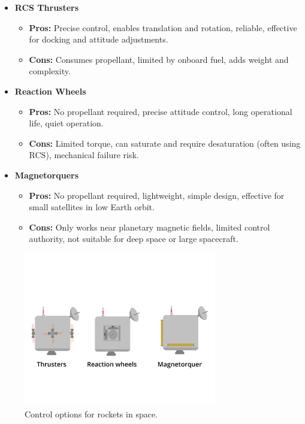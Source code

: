	\begin{itemize}
		\item \textbf{RCS Thrusters}
		\begin{itemize}
			\item \textbf{Pros:} Precise control, enables translation and rotation, reliable, effective for docking and attitude adjustments.
			\item \textbf{Cons:} Consumes propellant, limited by onboard fuel, adds weight and complexity.
		\end{itemize}
		\item \textbf{Reaction Wheels}
		\begin{itemize}
			\item \textbf{Pros:} No propellant required, precise attitude control, long operational life, quiet operation.
			\item \textbf{Cons:} Limited torque, can saturate and require desaturation (often using RCS), mechanical failure risk.
		\end{itemize}
		\item \textbf{Magnetorquers}
		\begin{itemize}
			\item \textbf{Pros:} No propellant required, lightweight, simple design, effective for small satellites in low Earth orbit.
			\item \textbf{Cons:} Only works near planetary magnetic fields, limited control authority, not suitable for deep space or large spacecraft.
		\end{itemize}
	\end{itemize}
	
	\begin{figure}[htbp]
		\centering
		\includegraphics[width=0.75\textwidth]{controlSpace.png}
		\caption{Control options for rockets in space.}
		\label{fig:atmosspace}
	\end{figure}
	


